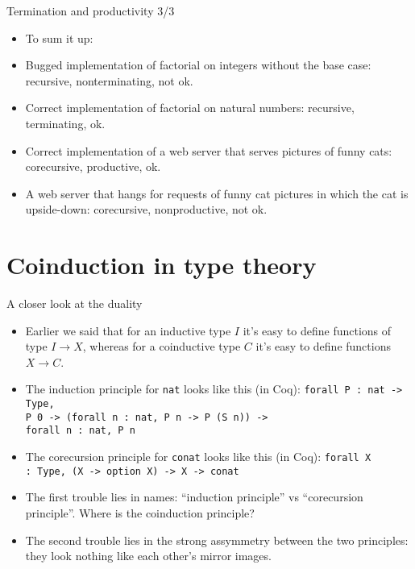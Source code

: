 \documentclass{beamer}
\begin{document}
\begin{frame}{Termination and productivity 3/3}
\begin{itemize}
	\item To sum it up:
	\item Bugged implementation of factorial on integers without the base case: recursive, nonterminating, not ok.
	\item Correct implementation of factorial on natural numbers: recursive, terminating, ok.
	\item Correct implementation of a web server that serves pictures of funny cats: corecursive, productive, ok.
	\item A web server that hangs for requests of funny cat pictures in which the cat is upside-down: corecursive, nonproductive, not ok.
\end{itemize}
\end{frame}

\section{Coinduction in type theory}

\begin{frame}{A closer look at the duality}
\begin{itemize}
	\item Earlier we said that for an inductive type $I$ it's easy to define functions of type $I \to X$, whereas for a coinductive type $C$ it's easy to define functions $X \to C$.
	\item The induction principle for \texttt{nat} looks like this (in Coq): \texttt{forall P :\ nat -> Type, \\ P 0 -> (forall n :\ nat, P n -> P (S n)) -> \\ forall n :\ nat, P n}
	\item The corecursion principle for \texttt{conat} looks like this (in Coq): \texttt{forall X :\ Type, (X -> option X) -> X -> conat}
	\item The first trouble lies in names: ``induction principle'' vs ``corecursion principle''. Where is the coinduction principle?
	\item The second trouble lies in the strong assymmetry between the two principles: they look nothing like each other's mirror images.
\end{itemize}
\end{frame}
\end{document}
